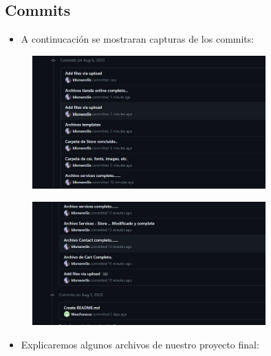 \subsection{Commits}
\begin{itemize}	
	\item A continucación se mostraran capturas de los commits:
\end{itemize}	
\begin{figure}[H]
	\centering
	\includegraphics[width=0.8\textwidth,keepaspectratio]{img/imagen11.jpg}
\end{figure}
\begin{figure}[H]
	\centering
	\includegraphics[width=0.8\textwidth,keepaspectratio]{img/imagen12.jpg}
\end{figure}
\begin{itemize}	
	\item Explicaremos algunos archivos de nuestro proyecto final:
\end{itemize}	

